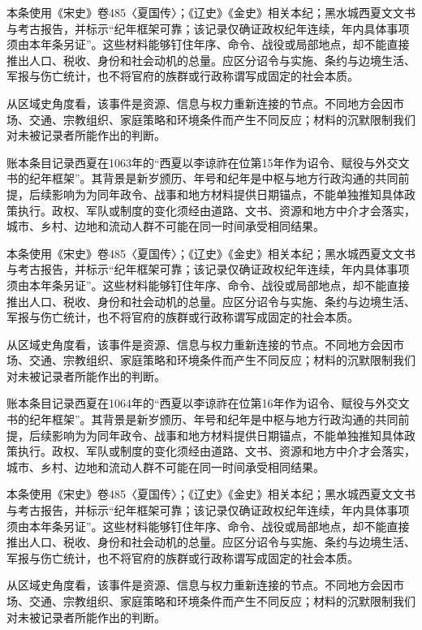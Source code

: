 本条使用《宋史》卷485〈夏国传〉；《辽史》《金史》相关本纪；黑水城西夏文文书与考古报告，并标示“纪年框架可靠；该记录仅确证政权纪年连续，年内具体事项须由本年条另证”。这些材料能够钉住年序、命令、战役或局部地点，却不能直接推出人口、税收、身份和社会动机的总量。应区分诏令与实施、条约与边境生活、军报与伤亡统计，也不将官府的族群或行政称谓写成固定的社会本质。

从区域史角度看，该事件是资源、信息与权力重新连接的节点。不同地方会因市场、交通、宗教组织、家庭策略和环境条件而产生不同反应；材料的沉默限制我们对未被记录者所能作出的判断。

账本条目记录西夏在1063年的“西夏以李谅祚在位第15年作为诏令、赋役与外交文书的纪年框架”。其背景是新岁颁历、年号和纪年是中枢与地方行政沟通的共同前提，后续影响为为同年政令、战事和地方材料提供日期锚点，不能单独推知具体政策执行。政权、军队或制度的变化须经由道路、文书、资源和地方中介才会落实，城市、乡村、边地和流动人群不可能在同一时间承受相同结果。

本条使用《宋史》卷485〈夏国传〉；《辽史》《金史》相关本纪；黑水城西夏文文书与考古报告，并标示“纪年框架可靠；该记录仅确证政权纪年连续，年内具体事项须由本年条另证”。这些材料能够钉住年序、命令、战役或局部地点，却不能直接推出人口、税收、身份和社会动机的总量。应区分诏令与实施、条约与边境生活、军报与伤亡统计，也不将官府的族群或行政称谓写成固定的社会本质。

从区域史角度看，该事件是资源、信息与权力重新连接的节点。不同地方会因市场、交通、宗教组织、家庭策略和环境条件而产生不同反应；材料的沉默限制我们对未被记录者所能作出的判断。

账本条目记录西夏在1064年的“西夏以李谅祚在位第16年作为诏令、赋役与外交文书的纪年框架”。其背景是新岁颁历、年号和纪年是中枢与地方行政沟通的共同前提，后续影响为为同年政令、战事和地方材料提供日期锚点，不能单独推知具体政策执行。政权、军队或制度的变化须经由道路、文书、资源和地方中介才会落实，城市、乡村、边地和流动人群不可能在同一时间承受相同结果。

本条使用《宋史》卷485〈夏国传〉；《辽史》《金史》相关本纪；黑水城西夏文文书与考古报告，并标示“纪年框架可靠；该记录仅确证政权纪年连续，年内具体事项须由本年条另证”。这些材料能够钉住年序、命令、战役或局部地点，却不能直接推出人口、税收、身份和社会动机的总量。应区分诏令与实施、条约与边境生活、军报与伤亡统计，也不将官府的族群或行政称谓写成固定的社会本质。

从区域史角度看，该事件是资源、信息与权力重新连接的节点。不同地方会因市场、交通、宗教组织、家庭策略和环境条件而产生不同反应；材料的沉默限制我们对未被记录者所能作出的判断。

